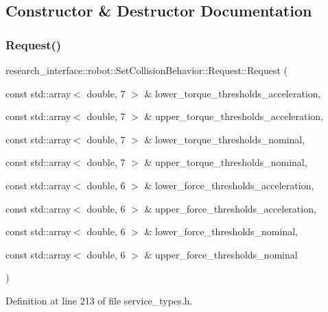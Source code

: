 \subsection{Constructor \& Destructor Documentation}
\mbox{\label{structresearch__interface_1_1robot_1_1SetCollisionBehavior_1_1Request_a45f725f94d814722be7e90f3605cef5c}} 
\subsubsection{\texorpdfstring{Request()}{Request()}}
{\footnotesize\ttfamily research\+\_\+interface\+::robot\+::\+Set\+Collision\+Behavior\+::\+Request\+::\+Request (\begin{DoxyParamCaption}\item[{const std\+::array$<$ double, 7 $>$ \&}]{lower\+\_\+torque\+\_\+thresholds\+\_\+acceleration,  }\item[{const std\+::array$<$ double, 7 $>$ \&}]{upper\+\_\+torque\+\_\+thresholds\+\_\+acceleration,  }\item[{const std\+::array$<$ double, 7 $>$ \&}]{lower\+\_\+torque\+\_\+thresholds\+\_\+nominal,  }\item[{const std\+::array$<$ double, 7 $>$ \&}]{upper\+\_\+torque\+\_\+thresholds\+\_\+nominal,  }\item[{const std\+::array$<$ double, 6 $>$ \&}]{lower\+\_\+force\+\_\+thresholds\+\_\+acceleration,  }\item[{const std\+::array$<$ double, 6 $>$ \&}]{upper\+\_\+force\+\_\+thresholds\+\_\+acceleration,  }\item[{const std\+::array$<$ double, 6 $>$ \&}]{lower\+\_\+force\+\_\+thresholds\+\_\+nominal,  }\item[{const std\+::array$<$ double, 6 $>$ \&}]{upper\+\_\+force\+\_\+thresholds\+\_\+nominal }\end{DoxyParamCaption})\hspace{0.3cm}{\ttfamily [inline]}}



Definition at line 213 of file service\+\_\+types.\+h.


